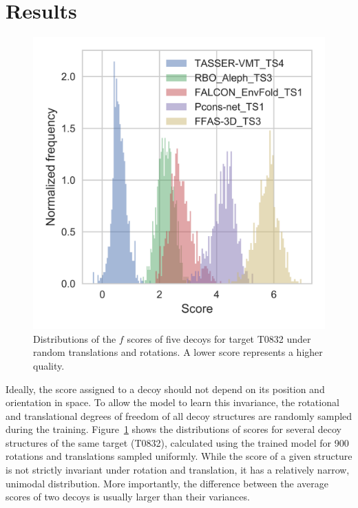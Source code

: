 \documentclass{bioinfo}
\begin{document}
\section{Results}
%
%
\begin{figure}[!tpb]
    \centering
    \includegraphics[width=\linewidth]{image5}
    \caption{Distributions of the $f$ scores of five decoys for target
    T0832 under random translations and rotations. A lower score
    represents a higher quality.}
    \label{Fig:DecoysScoreDistribution}
\end{figure}
%

Ideally, the score assigned to a decoy should not depend on its
position and orientation in space.  To allow the model to learn this
invariance, the rotational and translational degrees of freedom of all
decoy structures are randomly sampled during the training.
Figure~\ref{Fig:DecoysScoreDistribution} shows the distributions of
scores for several decoy structures of the same target (T0832),
calculated using the trained model for 900 rotations and translations
sampled uniformly.  While the score of a given structure is not
strictly invariant under rotation and translation, it has a relatively
narrow, unimodal distribution.  More importantly, the difference
between the average scores of two decoys is usually larger than their
variances.
\end{document}
